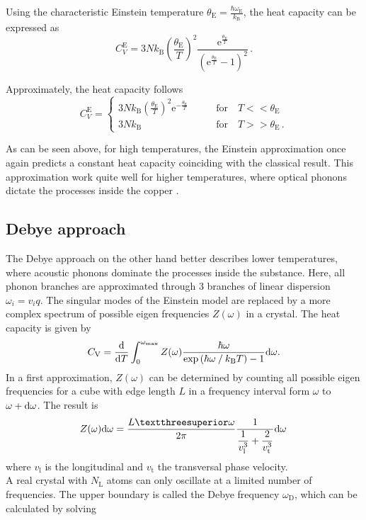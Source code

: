 Using the characteristic Einstein temperature $\theta_\text{E} = \frac{\hbar \omega_\text{E}}{k_\text{B}}$, the heat capacity can be expressed as
\begin{equation}
    C^\text{E}_V = 3 N k_\text{B} \left(\frac{\theta_\text{E}}{T} \right)^2 \frac{\text{e}^{\frac{\theta_\text{E}}{T}}}{\left(\text{e}^{\frac{\theta_\text{E}}{T}} - 1 \right)^2} \,.
    \label{eq:einsteinheatcap}
\end{equation}

Approximately, the heat capacity follows
\begin{equation*}
    C^\text{E}_V = \begin{cases}
        3 N k_\text{B} \left(\frac{\theta_\text{E}}{T} \right)^2 \text{e}^{-\frac{\theta_\text{E}}{T}} &\qquad \text{for} \quad T << \theta_\text{E} \\ 
        3 N k_\text{B} &\qquad \text{for} \quad T >> \theta_\text{E} \,.
    \end{cases} 
\end{equation*}

As can be seen above, for high temperatures, the Einstein approximation once again predicts a constant heat capacity coinciding with the classical result.
This approximation work quite well for higher temperatures, where optical phonons dictate the processes inside the copper \cite{grossmarx}.

\subsection{Debye approach}

The Debye approach on the other hand better describes lower temperatures, where acoustic phonons dominate the processes inside the substance.
Here, all phonon branches are approximated through $3$ branches of linear dispersion $\omega_i = v_i q$.
The singular modes of the Einstein model are replaced by a more complex spectrum of possible eigen frequencies $Z(\omega)$ in a crystal. 
The heat capacity is given by 
\begin{equation}
    C_\text{V} = \dfrac{\mathrm{d}}{\mathrm{d} T} \int^{\omega_\text{max}}_0 Z(\omega) \dfrac{\hbar \omega}{\exp{\left( \hbar \omega \mathbin{/} k_\text{B} T \right)} -1} \mathrm{d}\omega.
    \label{eq:CV_debye}
\end{equation}
In a first approximation, $Z(\omega)$ can be determined by counting all possible eigen frequencies for a cube with edge length $L$ in a frequency interval form $\omega$ to $\omega + \mathrm{d} \omega$.
The result is 
\begin{equation}
    Z(\omega)\dif\omega = \dfrac{L³ \omega}{2\pi}\dfrac{1}{\dfrac{1}{v^{3}_\text{l}} + \dfrac{2}{v^{3}_\text{t} }}  \dif\omega \, 
    \label{eq:densityofstates}
\end{equation}
where $v_\text{l}$ is the longitudinal and $v_\text{t}$ the transversal phase velocity. \\
A real crystal with $ N_\text{L}$ atoms can only oscillate at a limited number of frequencies. 
The upper boundary is called the Debye frequency $\omega_\text{D}$, which can be calculated by solving 

